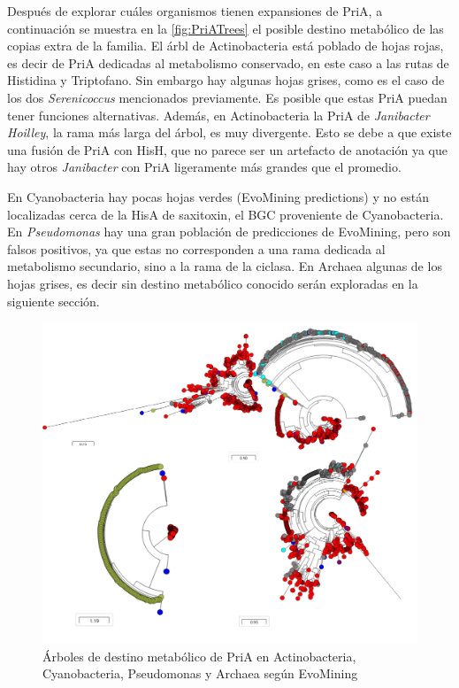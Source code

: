 \documentclass[12pt,twoside]{reedthesis}
\begin{document}
  Después de explorar cuáles organismos tienen expansiones de PriA, a
  continuación se muestra en la \autoref{fig:PriATrees} el posible destino
  metabólico de las copias extra de la familia. El árbl de Actinobacteria
  está poblado de hojas rojas, es decir de PriA dedicadas al metabolismo
  conservado, en este caso a las rutas de Histidina y Triptofano. Sin
  embargo hay algunas hojas grises, como es el caso de los dos
  \emph{Serenicoccus} mencionados previamente. Es posible que estas PriA
  puedan tener funciones alternativas. Además, en Actinobacteria la PriA
  de \emph{Janibacter Hoilley}, la rama más larga del árbol, es muy
  divergente. Esto se debe a que existe una fusión de PriA con HisH, que
  no parece ser un artefacto de anotación ya que hay otros
  \emph{Janibacter} con PriA ligeramente más grandes que el promedio.
  
  En Cyanobacteria hay pocas hojas verdes (EvoMining predictions) y no
  están localizadas cerca de la HisA de saxitoxin, el BGC proveniente de
  Cyanobacteria. En \emph{Pseudomonas} hay una gran población de
  predicciones de EvoMining, pero son falsos positivos, ya que estas no
  corresponden a una rama dedicada al metabolismo secundario, sino a la
  rama de la ciclasa. En Archaea algunas de los hojas grises, es decir sin
  destino metabólico conocido serán exploradas en la siguiente sección.
  
  \begin{figure}[h!tbp]
  \centering
  \includegraphics[angle = 0,scale = 0.8]{chapter4/PriAEvoMining.pdf}
  \caption[Árboles de destino metabólico de PriA en Actinobacteria, Cyanobacteria, {Pseudomonas} y Archaea según EvoMining]{\footnotesize{Árboles de destino metabólico de PriA en Actinobacteria, Cyanobacteria, {Pseudomonas} y Archaea según EvoMining}}
  \label{fig:PriATrees}
  \end{figure}
  
\end{document}
